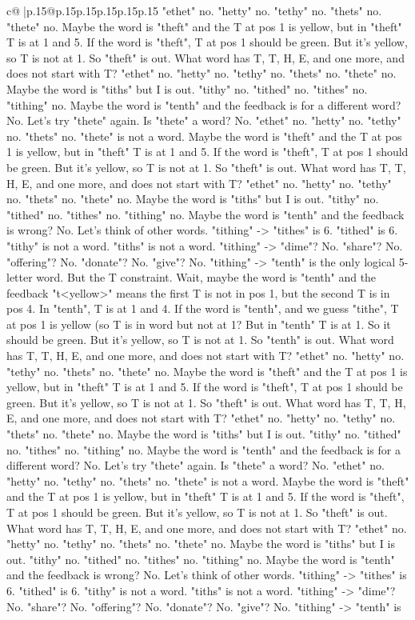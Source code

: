 \documentclass{article}
\begin{document}
{\begin{supertabular}{c@{$\;$}|p{.15\linewidth}@{}p{.15\linewidth}p{.15\linewidth}p{.15\linewidth}p{.15\linewidth}p{.15\linewidth}}
{{{"ethet" no. "hetty" no. "tethy" no. "thets" no. "thete" no. Maybe the word is "theft" and the T at pos 1 is yellow, but in "theft" T is at 1 and 5. If the word is "theft", T at pos 1 should be green. But it's yellow, so T is not at 1. So "theft" is out. What word has T, T, H, E, and one more, and does not start with T? "ethet" no. "hetty" no. "tethy" no. "thets" no. "thete" no. Maybe the word is "tiths" but I is out. "tithy" no. "tithed" no. "tithes" no. "tithing" no. Maybe the word is "tenth" and the feedback is for a different word? No. Let's try "thete" again. Is "thete" a word? No. "ethet" no. "hetty" no. "tethy" no. "thets" no. "thete" is not a word. Maybe the word is "theft" and the T at pos 1 is yellow, but in "theft" T is at 1 and 5. If the word is "theft", T at pos 1 should be green. But it's yellow, so T is not at 1. So "theft" is out. What word has T, T, H, E, and one more, and does not start with T? "ethet" no. "hetty" no. "tethy" no. "thets" no. "thete" no. Maybe the word is "tiths" but I is out. "tithy" no. "tithed" no. "tithes" no. "tithing" no. Maybe the word is "tenth" and the feedback is wrong? No. Let's think of other words. "tithing" {-}> "tithes" is 6. "tithed" is 6. "tithy" is not a word. "tiths" is not a word. "tithing" {-}> "dime"? No. "share"? No. "offering"? No. "donate"? No. "give"? No. "tithing" {-}> "tenth" is the only logical 5{-}letter word. But the T constraint. Wait, maybe the word is "tenth" and the feedback "t<yellow>" means the first T is not in pos 1, but the second T is in pos 4. In "tenth", T is at 1 and 4. If the word is "tenth", and we guess "tithe", T at pos 1 is yellow (so T is in word but not at 1? But in "tenth" T is at 1. So it should be green. But it's yellow, so T is not at 1. So "tenth" is out. What word has T, T, H, E, and one more, and does not start with T? "ethet" no. "hetty" no. "tethy" no. "thets" no. "thete" no. Maybe the word is "theft" and the T at pos 1 is yellow, but in "theft" T is at 1 and 5. If the word is "theft", T at pos 1 should be green. But it's yellow, so T is not at 1. So "theft" is out. What word has T, T, H, E, and one more, and does not start with T? "ethet" no. "hetty" no. "tethy" no. "thets" no. "thete" no. Maybe the word is "tiths" but I is out. "tithy" no. "tithed" no. "tithes" no. "tithing" no. Maybe the word is "tenth" and the feedback is for a different word? No. Let's try "thete" again. Is "thete" a word? No. "ethet" no. "hetty" no. "tethy" no. "thets" no. "thete" is not a word. Maybe the word is "theft" and the T at pos 1 is yellow, but in "theft" T is at 1 and 5. If the word is "theft", T at pos 1 should be green. But it's yellow, so T is not at 1. So "theft" is out. What word has T, T, H, E, and one more, and does not start with T? "ethet" no. "hetty" no. "tethy" no. "thets" no. "thete" no. Maybe the word is "tiths" but I is out. "tithy" no. "tithed" no. "tithes" no. "tithing" no. Maybe the word is "tenth" and the feedback is wrong? No. Let's think of other words. "tithing" {-}> "tithes" is 6. "tithed" is 6. "tithy" is not a word. "tiths" is not a word. "tithing" {-}> "dime"? No. "share"? No. "offering"? No. "donate"? No. "give"? No. "tithing" {-}> "tenth" is }}}
\end{supertabular}}
\end{document}
